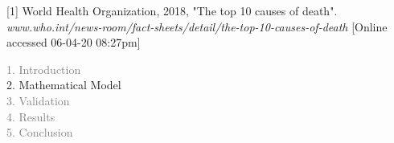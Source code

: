 \begin{frame}
\vspace{0.3cm}
\tiny [1] World Health Organization, 2018, "The top 10 causes of death".
\textit{www.who.int/news-room/fact-sheets/detail/the-top-10-causes-of-death}
[Online accessed 06-04-20 08:27pm]



\end{frame}



\begin{frame}
  \vspace{-1cm}
  \textcolor{gray}{1. Introduction}\\[0.1cm]
  2. Mathematical Model\\[0.1cm]
  \textcolor{gray}{3. Validation}\\[0.1cm]
  \textcolor{gray}{4. Results}\\[0.1cm]
  \textcolor{gray}{5. Conclusion}
\end{frame}



